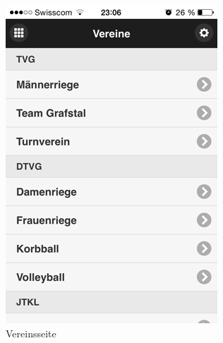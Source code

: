 \begin{figure}[h]
\centering
\includegraphics[scale=0.5]{images/app/vereine.png}
\caption{Vereinsseite}
\label{fig:app_vereine}
\end{figure}

\newpage
\FloatBarrier
